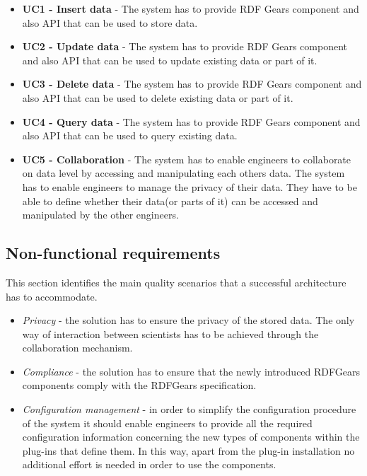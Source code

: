 \begin{itemize}

	\item \textbf{UC1 - Insert data} - The system has to provide RDF Gears component and also API that can be used to store data.

	\item \textbf{UC2 - Update data } - The system has to provide RDF Gears component and also API that can be used to update existing data or part of it.
	
	\item \textbf{UC3 - Delete data} - The system has to provide RDF Gears component and also API that can be used to delete existing data or part of it.
	
	\item \textbf{UC4 - Query data} - The system has to provide RDF Gears component and also API that can be used to query existing data.
	
	\item \textbf{UC5 - Collaboration} - The system has to enable engineers to collaborate on data level by accessing and manipulating each others data. The system has to enable engineers to manage the privacy of their data. They have to be able to define whether their data(or parts of it) can be accessed and manipulated by the other engineers.

\end{itemize}

\subsection{Non-functional requirements}
This section identifies the main quality scenarios that a successful architecture has to accommodate.

\begin{itemize}
	\item \textit{Privacy} - the solution has to ensure the privacy of the stored data. The only way of interaction between scientists has to be achieved through the collaboration mechanism.
	
	\item \textit{Compliance} - the solution has to ensure that the newly introduced RDFGears components comply with the RDFGears specification. 
	
	\item \textit{Configuration management} - in order to simplify the configuration procedure of the system it should enable engineers to provide all the required configuration information concerning the new types of components within the plug-ins that define them. In this way, apart from the plug-in installation no additional effort is needed in order to use the components.
	
\end{itemize}

